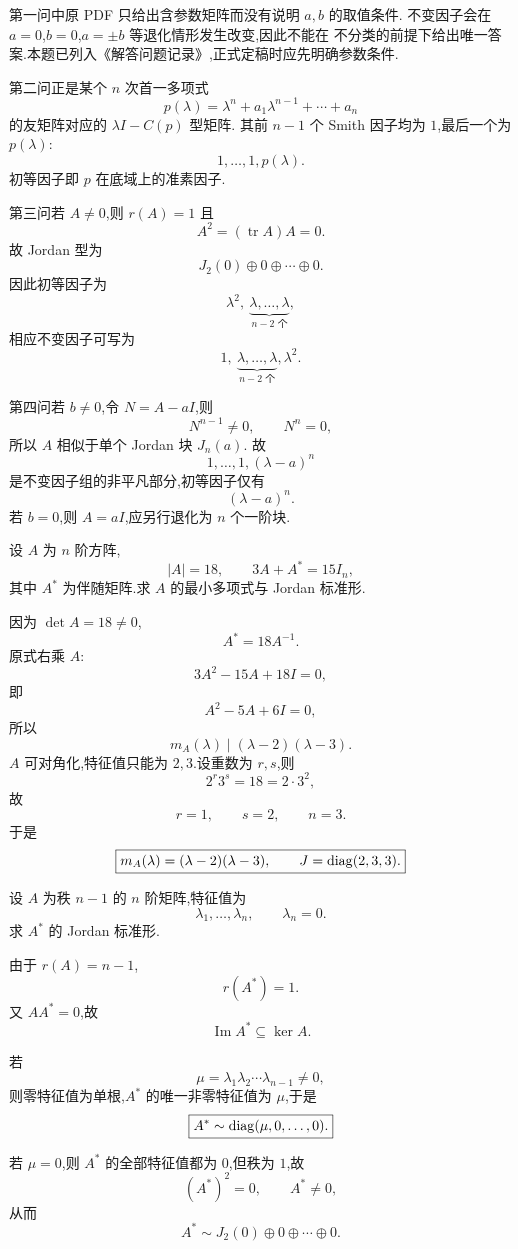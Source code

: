 \begin{solution}
第一问中原 PDF 只给出含参数矩阵而没有说明 $a,b$ 的取值条件.
不变因子会在 $a=0$,$b=0$,$a=\pm b$ 等退化情形发生改变,因此不能在
不分类的前提下给出唯一答案.本题已列入《解答问题记录》,正式定稿时应先明确参数条件.

第二问正是某个 $n$ 次首一多项式
\[
p(\lambda)
=
\lambda^n+a_1\lambda^{n-1}+\cdots+a_n
\]
的友矩阵对应的 $\lambda I-C(p)$ 型矩阵.
其前 $n-1$ 个 Smith 因子均为 $1$,最后一个为 $p(\lambda)$:
\[
\boxed{
1,\ldots,1,p(\lambda).
}
\]
初等因子即 $p$ 在底域上的准素因子.

第三问若 $A\neq0$,则 $r(A)=1$ 且
\[
A^2=(\operatorname{tr}A)A=0.
\]
故 Jordan 型为
\[
J_2(0)\oplus 0\oplus\cdots\oplus0.
\]
因此初等因子为
\[
\boxed{\lambda^2,\ \underbrace{\lambda,\ldots,\lambda}_{n-2\text{ 个}}},
\]
相应不变因子可写为
\[
\boxed{
1,\ 
\underbrace{\lambda,\ldots,\lambda}_{n-2\text{ 个}},
\lambda^2.
}
\]

第四问若 $b\neq0$,令 $N=A-aI$,则
\[
N^{n-1}\neq0,\qquad N^n=0,
\]
所以 $A$ 相似于单个 Jordan 块 $J_n(a)$.
故
\[
\boxed{
1,\ldots,1,(\lambda-a)^n
}
\]
是不变因子组的非平凡部分,初等因子仅有
\[
\boxed{(\lambda-a)^n}.
\]
若 $b=0$,则 $A=aI$,应另行退化为 $n$ 个一阶块.
\end{solution}


\begin{example}
设 $A$ 为 $n$ 阶方阵,
\[
|A|=18,
\qquad
3A+A^*=15I_n,
\]
其中 $A^*$ 为伴随矩阵.求 $A$ 的最小多项式与 Jordan 标准形.
\end{example}
\exampleblank

\begin{solution}
因为 $\det A=18\neq0$,
\[
A^*=18A^{-1}.
\]
原式右乘 $A$:
\[
3A^2-15A+18I=0,
\]
即
\[
A^2-5A+6I=0,
\]
所以
\[
m_A(\lambda)\mid(\lambda-2)(\lambda-3).
\]
$A$ 可对角化,特征值只能为 $2,3$.设重数为 $r,s$,则
\[
2^r3^s=18=2\cdot3^2,
\]
故
\[
r=1,\qquad s=2,\qquad n=3.
\]
于是
\[
\boxed{
m_A(\lambda)=(\lambda-2)(\lambda-3),
\qquad
J=\operatorname{diag}(2,3,3).
}
\]
\end{solution}


\begin{example}
设 $A$ 为秩 $n-1$ 的 $n$ 阶矩阵,特征值为
\[
\lambda_1,\ldots,\lambda_n,
\qquad
\lambda_n=0.
\]
求 $A^*$ 的 Jordan 标准形.
\end{example}
\exampleblank

\begin{solution}
由于 $r(A)=n-1$,
\[
r(A^*)=1.
\]
又 $AA^*=0$,故
\[
\operatorname{Im}A^*\subseteq\ker A.
\]

若
\[
\mu=\lambda_1\lambda_2\cdots\lambda_{n-1}\neq0,
\]
则零特征值为单根,$A^*$ 的唯一非零特征值为 $\mu$,于是
\[
\boxed{
A^*\sim\operatorname{diag}(\mu,0,\ldots,0).
}
\]

若 $\mu=0$,则 $A^*$ 的全部特征值都为 $0$,但秩为 $1$,故
\[
(A^*)^2=0,\qquad A^*\neq0,
\]
从而
\[
\boxed{
A^*\sim J_2(0)\oplus0\oplus\cdots\oplus0.
}
\]
\end{solution}


